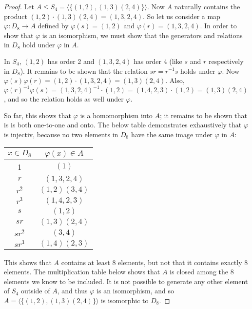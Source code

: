 \documentclass{article}
\begin{document}
\begin{proof}
    Let $A \leq S_4 = \langle \{ (1, 2), (1, 3)(2, 4) \} \rangle$. Now $A$ naturally contains the product $(1, 2) \cdot (1, 3)(2, 4) = (1, 3, 2, 4)$. So let us consider a map $\varphi: D_8 \rightarrow A$ defined by $\varphi(s) = (1, 2)$ and $\varphi(r) = (1, 3, 2, 4)$. In order to show that $\varphi$ is an isomorphism, we must show that the generators and relations in $D_8$ hold under $\varphi$ in $A$.

    In $S_4$, $(1, 2)$ has order 2 and $(1, 3, 2, 4)$ has order 4 (like $s$ and $r$ respectively in $D_8$). It remains to be shown that the relation $sr = r^{-1}s$ holds under $\varphi$. Now $\varphi(s)\varphi(r) = (1, 2) \cdot (1, 3, 2, 4) = (1, 3)(2, 4)$. Also, $\varphi(r)^{-1}\varphi(s) = (1, 3, 2, 4)^{-1} \cdot (1, 2) = (1, 4, 2, 3) \cdot (1, 2) = (1, 3)(2, 4)$, and so the relation holds as well under $\varphi$.

    So far, this shows that $\varphi$ is a homomorphism into $A$; it remains to be shown that is is both one-to-one and onto. The below table demonstrates exhaustively that $\varphi$ is injectiv, because no two elements in $D_8$ have the same image under $\varphi$ in $A$:

    \begin{center}
        \begin{tabular}{ |c|c| } 
            \hline
            $x \in D_8$ & $\varphi(x) \in A$ \\
            \hline
            1 & $(1)$ \\
            \hline
            $r$ & $(1, 3, 2, 4)$ \\
            \hline
            $r^2$ & $(1, 2)(3, 4)$ \\
            \hline
            $r^3$ & $(1, 4, 2, 3)$ \\
            \hline
            $s$ & $(1, 2)$ \\
            \hline
            $sr$ & $(1, 3)(2, 4)$ \\
            \hline
            $sr^2$ & $(3, 4)$ \\
            \hline
            $sr^3$ & $(1, 4)(2, 3)$ \\
            \hline
        \end{tabular}
    \end{center}

    This shows that $A$ contains at least 8 elements, but not that it contains exactly 8 elements. The multiplication table below shows that $A$ is closed among the 8 elements we know to be included. It is not possible to generate any other element of $S_4$ outside of $A$, and thus $\varphi$ is an isomorphism, and so $A = \langle \{ (1, 2), (1, 3)(2, 4) \} \rangle$ is isomorphic to $D_8$.


\end{proof}
\end{document}
